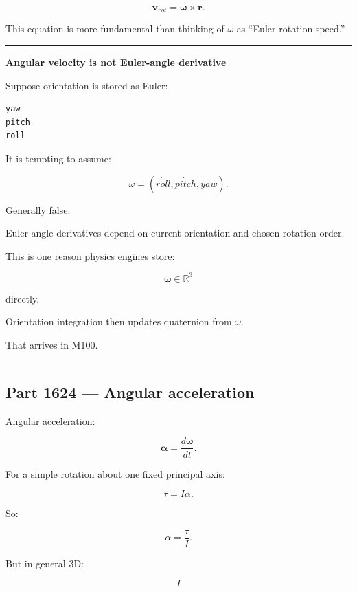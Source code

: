 \[
\boxed{
\mathbf{v}_{rot}
=
\boldsymbol{\omega}\times\mathbf{r}.
}
\]

This equation is more fundamental than thinking of \(\omega\) as ``Euler rotation speed.''

\begin{center}\rule{0.5\linewidth}{0.5pt}\end{center}

\textbf{Angular velocity is not Euler-angle derivative}

Suppose orientation is stored as Euler:

\begin{verbatim}
yaw
pitch
roll
\end{verbatim}

It is tempting to assume:

\[
\omega
=
(\dot{roll},\dot{pitch},\dot{yaw}).
\]

Generally false.

Euler-angle derivatives depend on current orientation and chosen rotation order.

This is one reason physics engines store:

\[
\boldsymbol{\omega}\in\mathbb{R}^3
\]

directly.

Orientation integration then updates quaternion from \(\omega\).

That arrives in M100.

\begin{center}\rule{0.5\linewidth}{0.5pt}\end{center}

\subsection{Part 1624 --- Angular acceleration}\label{06-engine-ii-ch035-part-1624-angular-acceleration}

\hypertarget{06-engine-ii-ch035-part-1624-angular-acceleration}{}

Angular acceleration:

\[
\boxed{
\boldsymbol{\alpha}
=
\frac{d\boldsymbol{\omega}}{dt}.
}
\]

For a simple rotation about one fixed principal axis:

\[
\tau=I\alpha.
\]

So:

\[
\alpha
=
\frac{\tau}{I}.
\]

But in general 3D:

\[
I
\]

